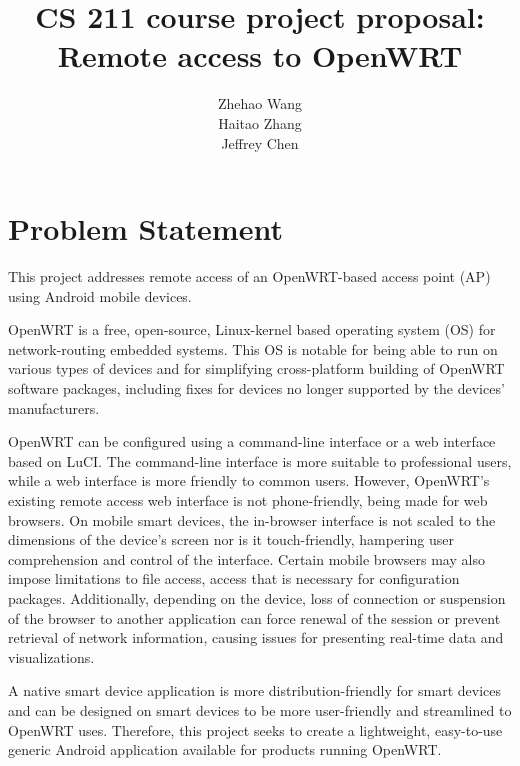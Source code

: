 \documentclass{sig-alternate-05-2015}
\begin{document}
	
	\title{CS 211 course project proposal: \\Remote access to OpenWRT}
	
	
	\author{
		\alignauthor
		Zhehao Wang \\
		\alignauthor
		Haitao Zhang \\
		\alignauthor 
		Jeffrey Chen
	}
	
	\maketitle
	
	\section{Problem Statement}
	
	This project addresses remote access of an OpenWRT-based access point (AP) using Android mobile devices.
	

	OpenWRT is a free, open-source, Linux-kernel based operating system (OS) for network-routing embedded systems. This OS is notable for being able to run on various types of devices and for simplifying cross-platform building of OpenWRT software packages, including fixes for devices no longer supported by the devices' manufacturers.
	
	OpenWRT can be configured using a command-line interface or a web interface based on LuCI. The command-line interface is more suitable to professional users, while a web interface is more friendly to common users. However, OpenWRT's existing remote access web interface is not phone-friendly, being made for web browsers. On mobile smart devices, the in-browser interface is not scaled to the dimensions of the device's screen nor is it touch-friendly, hampering user comprehension and control of the interface. Certain mobile browsers may also impose limitations to file access, access that is necessary for configuration packages. Additionally, depending on the device, loss of connection or suspension of the browser to another application can force renewal of the session or prevent retrieval of network information, causing issues for presenting real-time data and visualizations.
	
	A native smart device application is more distribution-friendly for smart devices and can be designed on smart devices to be more user-friendly and streamlined to OpenWRT uses. Therefore, this project seeks to create a lightweight, easy-to-use generic Android application available for products running OpenWRT.
	
\end{document}
